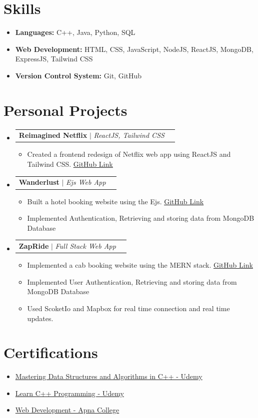 \documentclass[letterpaper,11pt]{article}
\makeatletter
\newcommand{\resumeItem}[1]{\item\small{#1 \vspace{-2pt}}}
\newcommand{\resumeProjectHeading}[2]{\item\begin{tabular*}{0.97\textwidth}{l@{\extracolsep{\fill}}r}\small#1 & #2 \\ \end{tabular*}\vspace{-7pt}}
\newcommand{\resumeSubHeadingListStart}{\begin{itemize}[leftmargin=0.15in, label={}]}
\newcommand{\resumeSubHeadingListEnd}{\end{itemize}}
\newcommand{\resumeItemListStart}{\begin{itemize}}
\newcommand{\resumeItemListEnd}{\end{itemize}\vspace{-5pt}}
\makeatother
\begin{document}

\section{\textbf{Skills}}
\begin{itemize}[leftmargin=*, itemsep=-2pt]
    \item \textbf{Languages:} C++, Java, Python, SQL
    \item \textbf{Web Development:} HTML, CSS, JavaScript, NodeJS, ReactJS, MongoDB, ExpressJS, Tailwind CSS
    \item \textbf{Version Control System:} Git, GitHub
    
\end{itemize}

\section{\textbf{Personal Projects}}
\resumeSubHeadingListStart
\resumeProjectHeading
{\textbf{Reimagined Netflix} $|$ \footnotesize \emph{ReactJS, Tailwind CSS}}{}
\resumeItemListStart
\resumeItem{Created a frontend redesign of Netflix web app using ReactJS and Tailwind CSS. \href{https://api-alchemists-reimagine-round2.vercel.app/}{\underline{GitHub Link}}}
\resumeItemListEnd



\resumeProjectHeading
{\textbf{Wanderlust} $|$ \footnotesize \emph{Ejs Web App}}{}
\resumeItemListStart
\resumeItem{Built a hotel booking website using the Ejs. \href{https://major-project-xdfh.onrender.com/listings}{\underline{GitHub Link}}}
\resumeItem{Implemented Authentication, Retrieving and storing data from MongoDB Database}
\resumeItemListEnd


\resumeProjectHeading
{\textbf{ZapRide} $|$ \footnotesize \emph{Full Stack Web App}}{}
\resumeItemListStart
\resumeItem{Implemented a cab booking website using the MERN stack. \href{https://zapride-frontend.onrender.com/}{\underline{GitHub Link}}}
\resumeItem{Implemented User Authentication, Retrieving and storing data from MongoDB Database}
\resumeItem{Used ScoketIo and Mapbox for real time connection and real time updates.}
\resumeItemListEnd
\resumeSubHeadingListEnd


\section{\textbf{Certifications}}
\begin{itemize}[leftmargin=*, itemsep=-5pt]
    \item \href{https://www.udemy.com/certificate/UC-690ca4e6-b24d-4551-b1d6-edd57ff97ad3/}{Mastering Data Structures and Algorithms in C++ - Udemy}
    \item \href{https://www.udemy.com/certificate/UC-d5e22d52-cbe1-40ae-9148-d1722c71d680/}{Learn C++ Programming - Udemy}
    \item \href{https://drive.google.com/file/d/1Ym6y97-HAdRvaqvt4BSZHDbz_YDCas2E/view?usp=drive_link}{Web Development - Apna College}
\end{itemize}
\end{document}
